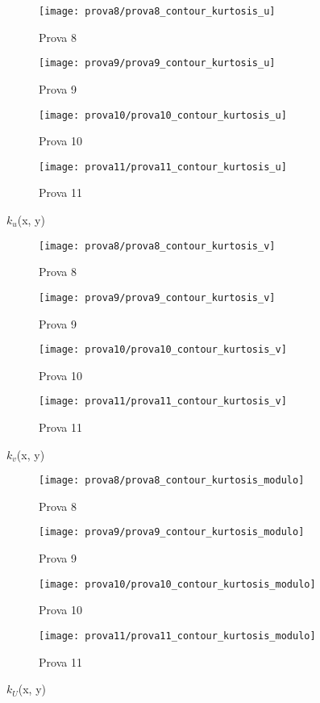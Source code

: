 \documentclass{article} %
\begin{document}
\begin{figure}[h!]
	\centering
	\begin{subfigure}[b]{0.24\textwidth}
		\texttt{[image: prova8/prova8\_contour\_kurtosis\_u]}
		\caption{Prova 8}
	\end{subfigure}
	\begin{subfigure}[b]{0.24\textwidth}
		\texttt{[image: prova9/prova9\_contour\_kurtosis\_u]}
		\caption{Prova 9}
	\end{subfigure}
	\begin{subfigure}[b]{0.24\textwidth}
		\texttt{[image: prova10/prova10\_contour\_kurtosis\_u]}
		\caption{Prova 10}
	\end{subfigure}
	\begin{subfigure}[b]{0.24\textwidth}
		\texttt{[image: prova11/prova11\_contour\_kurtosis\_u]}
		\caption{Prova 11}
	\end{subfigure}
	\caption{$k_u$(x, y)}
	\label{fig:contour_kurtosis_u_8901}
\end{figure}
\begin{figure}[h!]
	\centering
	\begin{subfigure}[b]{0.24\textwidth}
		\texttt{[image: prova8/prova8\_contour\_kurtosis\_v]}
		\caption{Prova 8}
	\end{subfigure}
	\begin{subfigure}[b]{0.24\textwidth}
		\texttt{[image: prova9/prova9\_contour\_kurtosis\_v]}
		\caption{Prova 9}
	\end{subfigure}
	\begin{subfigure}[b]{0.24\textwidth}
		\texttt{[image: prova10/prova10\_contour\_kurtosis\_v]}
		\caption{Prova 10}
	\end{subfigure}
	\begin{subfigure}[b]{0.24\textwidth}
		\texttt{[image: prova11/prova11\_contour\_kurtosis\_v]}
		\caption{Prova 11}
	\end{subfigure}
	\caption{$k_v$(x, y)}
	\label{fig:contour_kurtosis_v_8901}
\end{figure}	
\begin{figure}[h!]
	\centering
	\begin{subfigure}[b]{0.24\textwidth}
		\texttt{[image: prova8/prova8\_contour\_kurtosis\_modulo]}
		\caption{Prova 8}
	\end{subfigure}
	\begin{subfigure}[b]{0.24\textwidth}
		\texttt{[image: prova9/prova9\_contour\_kurtosis\_modulo]}
		\caption{Prova 9}
	\end{subfigure}
	\begin{subfigure}[b]{0.24\textwidth}
		\texttt{[image: prova10/prova10\_contour\_kurtosis\_modulo]}
		\caption{Prova 10}
	\end{subfigure}
	\begin{subfigure}[b]{0.24\textwidth}
		\texttt{[image: prova11/prova11\_contour\_kurtosis\_modulo]}
		\caption{Prova 11}
	\end{subfigure}
	\caption{$k_U$(x, y)}
	\label{fig:contour_kurtosis_modulo_8901}
\end{figure}\par	
\end{document}
